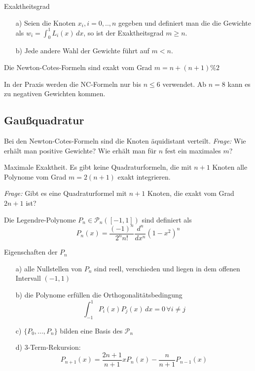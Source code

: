 \begin{theorem}[Satz I.3]
	Exaktheitsgrad
	
	\begin{itemize}
		\item[a)] Seien die Knoten $x_i, i = 0, .., n$ gegeben und definiert man die die Gewichte als $w_i = \int^1_0\!L_i(x) \,dx$, so ist der Exaktheitsgrad $m \ge n$.
		\item[b)] Jede andere Wahl der Gewichte führt auf $m < n$.
	\end{itemize}
\end{theorem}

\begin{theorem}[Satz I.4]
	Die Newton-Cotes-Formeln sind exakt vom Grad $m = n + (n+1)\%2$
\end{theorem}

\begin{remark}
In der Praxis werden die NC-Formeln nur bis $n\leq 6$ verwendet. Ab $n=8$ kann es zu negativen Gewichten kommen.
\end{remark}
	
	
\subsection{Gaußquadratur}

Bei den Newton-Cotes-Formeln sind die Knoten äquidistant verteilt. \emph{Frage:} Wie erhält man positive Gewichte? Wie erhält man für $n$ fest ein maximales $m$?

\begin{theorem}[Satz I.5] Maximale Exaktheit. Es gibt keine Quadraturformeln, die mit $n+1$ Knoten alle Polynome vom Grad $m = 2(n+1)$ exakt integrieren.\end{theorem} 	

\emph{Frage:} Gibt es eine Quadraturformel mit $n+1$ Knoten, die exakt vom Grad $2n+1$ ist?

\begin{definition}[Definition I.6] Die Legendre-Polynome $P_n \in \mathcal{P}_n ([-1,1])$ sind definiert als 
$$P_n(x) = \frac{(-1)^n}{2^n n!} \frac{d^n}{dx^n} (1-x^2)^n$$
\end{definition}

\begin{theorem}[Satz I.6] Eigenschaften der $P_n$
	\begin{itemize}
		\item[a)] alle Nullstellen von $P_n$ sind reell, verschieden und liegen in dem offenen Intervall $(-1, 1)$
		\item[b)] die Polynome erfüllen die Orthogonalitätsbedingung 
				$$\int_{-1}^1\!P_i(x) P_j(x)\,dx = 0\,\forall i \ne j$$
		\item[c)] $\{P_0, ..., P_n\}$ bilden eine Basis des $\mathcal{P}_n$
		\item[d)] 3-Term-Rekursion:
		$$P_{n+1}(x) = \frac{2n+1}{n+1} x P_n(x) - \frac{n}{n+1} P_{n-1}(x)$$
	\end{itemize}
\end{theorem}

